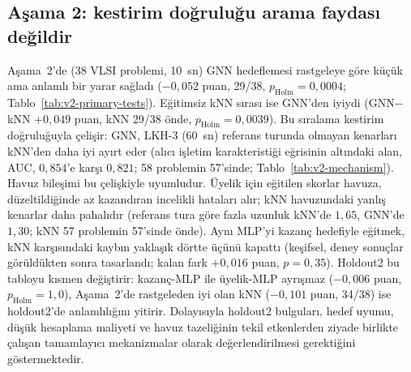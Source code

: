 

\subsection{Aşama 2: kestirim doğruluğu arama faydası değildir}\label{sec:bulgular-asama2}

Aşama~2'de (38 VLSI problemi, 10~sn) GNN hedeflemesi rastgeleye göre küçük ama anlamlı bir yarar
sağladı ($-0{,}052$ puan, 29/38, $p_{\mathrm{Holm}}=0{,}0004$; Tablo~\ref{tab:v2-primary-tests}).
Eğitimsiz kNN sırası ise GNN'den iyiydi (GNN$-$kNN $+0{,}049$ puan, kNN 29/38 önde,
$p_{\mathrm{Holm}}=0{,}0039$).
Bu sıralama kestirim doğruluğuyla çelişir: GNN, LKH-3 (60~sn) referans turunda olmayan kenarları kNN'den
daha iyi ayırt eder (alıcı işletim karakteristiği eğrisinin altındaki alan, AUC, $0{,}854$'e karşı $0{,}821$; 58 problemin 57'sinde;
Tablo~\ref{tab:v2-mechanism}).
Havuz bileşimi bu çelişkiyle uyumludur. Üyelik için eğitilen skorlar havuza, düzeltildiğinde az
kazandıran incelikli hataları alır; kNN havuzundaki yanlış kenarlar daha pahalıdır (referans tura
göre fazla uzunluk kNN'de $1{,}65$, GNN'de $1{,}30$; kNN 57 problemin 57'sinde önde).
Aynı MLP'yi kazanç hedefiyle eğitmek, kNN karşısındaki kaybın yaklaşık dörtte üçünü kapattı
(keşifsel, deney sonuçlar görüldükten sonra tasarlandı; kalan fark $+0{,}016$ puan, $p=0{,}35$).
Holdout2 bu tabloyu kısmen değiştirir: kazanç-MLP ile üyelik-MLP ayrışmaz ($-0{,}006$ puan,
$p_{\mathrm{Holm}}=1{,}0$), Aşama~2'de rastgeleden iyi olan kNN ($-0{,}101$ puan, 34/38) ise
holdout2'de anlamlılığını yitirir.
Dolayısıyla holdout2 bulguları, hedef uyumu, düşük hesaplama maliyeti ve havuz tazeliğinin tekil
etkenlerden ziyade birlikte çalışan tamamlayıcı mekanizmalar olarak değerlendirilmesi gerektiğini
göstermektedir.



